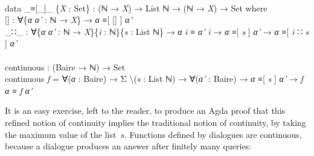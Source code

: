 \documentclass{entcs} \usepackage{prentcsmacro}
\newcommand{\AgdaFontStyle}[1]{\textsf{#1}}
\newcommand{\AgdaBoundFontStyle}[1]{\textit{#1}}
\newcommand{\AgdaKeyword}     [1]
    {\AgdaFontStyle{\textcolor{AgdaKeyword}{#1}}}
\newcommand{\AgdaSymbol}      [1]{\textcolor{AgdaSymbol}{#1}}
\newcommand{\AgdaPrimitiveType}[1]
    {\AgdaFontStyle{\textcolor{AgdaPrimitiveType}{#1}}}
\newcommand{\AgdaBound}    [1]{\AgdaBoundFontStyle{\textcolor{AgdaBound}{#1}}}
\newcommand{\AgdaInductiveConstructor}[1]
    {\AgdaFontStyle{\textcolor{AgdaInductiveConstructor}{#1}}}
\newcommand{\AgdaDatatype} [1]{\AgdaFontStyle{\textcolor{AgdaDatatype}{#1}}}
\newcommand{\AgdaFunction} [1]{\AgdaFontStyle{\textcolor{AgdaFunction}{#1}}}
\newcommand{\AgdaIndent}[1]{\quad}
\newcommand{\AgdaCodeStyle}{\small}
\newenvironment{code}%
{\noindent\AgdaCodeStyle\pboxed}%
{\endpboxed\par\noindent%
\ignorespacesafterend}
\begin{document}
\begin{code}\>\<%
\\
\>\AgdaKeyword{data} \AgdaDatatype{\_≡[\_]\_} \AgdaSymbol{\{}\AgdaBound{X} \AgdaSymbol{:} \AgdaPrimitiveType{Set}\AgdaSymbol{\}} \AgdaSymbol{:} \AgdaSymbol{(}\AgdaDatatype{ℕ} \AgdaSymbol{→} \AgdaBound{X}\AgdaSymbol{)} \AgdaSymbol{→} \AgdaDatatype{List} \AgdaDatatype{ℕ} \AgdaSymbol{→} \AgdaSymbol{(}\AgdaDatatype{ℕ} \AgdaSymbol{→} \AgdaBound{X}\AgdaSymbol{)} \AgdaSymbol{→} \AgdaPrimitiveType{Set} \AgdaKeyword{where}\<%
\\
\>[0]\AgdaIndent{2}{}\<[2]%
\>[2]\AgdaInductiveConstructor{[]} \<[6]%
\>[6]\AgdaSymbol{:} \AgdaSymbol{∀\{}\AgdaBound{α} \AgdaBound{α'} \AgdaSymbol{:} \AgdaDatatype{ℕ} \AgdaSymbol{→} \AgdaBound{X}\AgdaSymbol{\}} \AgdaSymbol{→} \AgdaBound{α} \AgdaDatatype{≡[} \AgdaInductiveConstructor{[]} \AgdaDatatype{]} \AgdaBound{α'} \<[39]%
\>[39]\<%
\\
\>[0]\AgdaIndent{2}{}\<[2]%
\>[2]\AgdaInductiveConstructor{\_∷\_} \AgdaSymbol{:} \AgdaSymbol{∀\{}\AgdaBound{α} \AgdaBound{α'} \AgdaSymbol{:} \AgdaDatatype{ℕ} \AgdaSymbol{→} \AgdaBound{X}\AgdaSymbol{\}\{}\AgdaBound{i} \AgdaSymbol{:} \AgdaDatatype{ℕ}\AgdaSymbol{\}\{}\AgdaBound{s} \AgdaSymbol{:} \AgdaDatatype{List} \AgdaDatatype{ℕ}\AgdaSymbol{\}} \AgdaSymbol{→} \AgdaBound{α} \AgdaBound{i} \AgdaDatatype{≡} \AgdaBound{α'} \AgdaBound{i} \AgdaSymbol{→} \AgdaBound{α} \AgdaDatatype{≡[} \AgdaBound{s} \AgdaDatatype{]} \AgdaBound{α'} \AgdaSymbol{→} \AgdaBound{α} \AgdaDatatype{≡[} \AgdaBound{i} \AgdaInductiveConstructor{∷} \AgdaBound{s} \AgdaDatatype{]} \AgdaBound{α'}\<%
\\
%
\\
\>\AgdaFunction{continuous} \AgdaSymbol{:} \AgdaSymbol{(}\AgdaFunction{Baire} \AgdaSymbol{→} \AgdaDatatype{ℕ}\AgdaSymbol{)} \AgdaSymbol{→} \AgdaPrimitiveType{Set}\<%
\\
\>\AgdaFunction{continuous} \AgdaBound{f} \AgdaSymbol{=} \AgdaSymbol{∀(}\AgdaBound{α} \AgdaSymbol{:} \AgdaFunction{Baire}\AgdaSymbol{)} \AgdaSymbol{→} \AgdaDatatype{Σ} \AgdaSymbol{	\textbackslash(}\AgdaBound{s} \AgdaSymbol{:} \AgdaDatatype{List} \AgdaDatatype{ℕ}\AgdaSymbol{)} \AgdaSymbol{→} \AgdaSymbol{∀(}\AgdaBound{α'} \AgdaSymbol{:} \AgdaFunction{Baire}\AgdaSymbol{)} \AgdaSymbol{→} \AgdaBound{α} \AgdaDatatype{≡[} \AgdaBound{s} \AgdaDatatype{]} \AgdaBound{α'} \AgdaSymbol{→} \AgdaBound{f} \AgdaBound{α} \AgdaDatatype{≡} \AgdaBound{f} \AgdaBound{α'}\<%
\\
\>\<\end{code}
It is an easy exercise, left to the reader, to produce an Agda proof
that this refined notion of continuity implies the traditional notion
of continuity, by taking the maximum value of the list~$s$.
Functions defined by dialogues are continuous, because a dialogue
produces an answer after finitely many queries:
\end{document}
